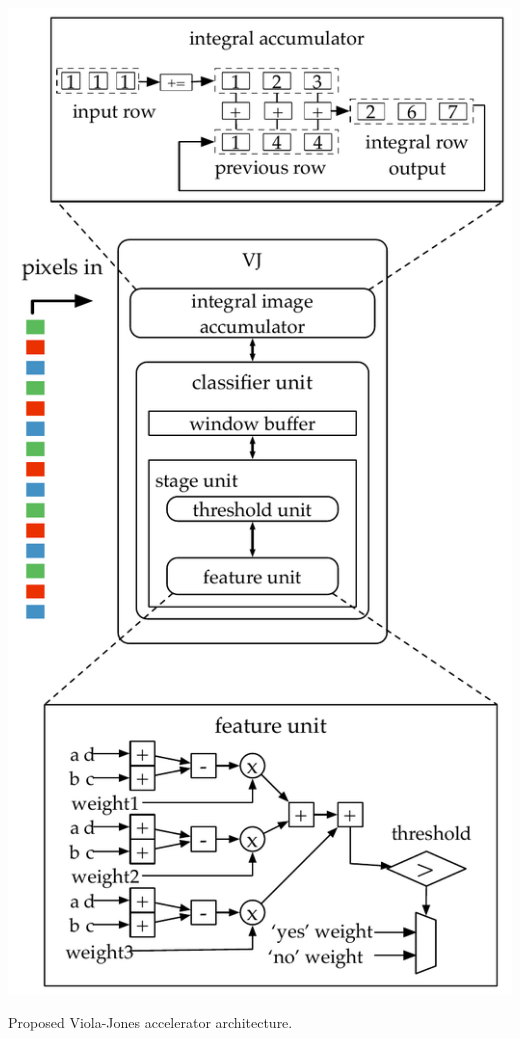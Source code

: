 \begin{marginfigure}
      \includegraphics[width=\textwidth]{nsp-figs/vj_arch.pdf}
    \caption{Proposed Viola-Jones accelerator architecture.}

    \label{fig:vj-block}
\end{marginfigure}

